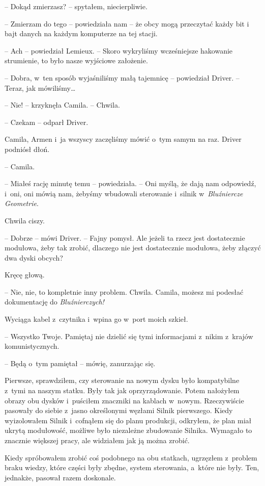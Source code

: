 \documentclass[oneside,polish,12pt,sfheadings]{mwbk}
\begin{document}
-- Dokąd zmierzasz? -- spytałem, niecierpliwie.

-- Zmierzam do tego -- powiedziała nam -- że obcy mogą przeczytać każdy bit
i bajt danych na każdym komputerze na tej stacji.

-- Ach -- powiedział Lemieux. -- Skoro wykryliśmy wcześniejsze hakowanie
strumienie, to było nasze wyjściowe założenie.

-- Dobra, w~ten sposób wyjaśniliśmy małą tajemnicę -- powiedział Driver.
-- Teraz, jak mówiliśmy\ldots

-- Nie! -- krzyknęła Camila. -- Chwila.

-- Czekam -- odparł Driver.

Camila, Armen i~ja wszyscy zaczęliśmy mówić o~tym samym na raz. Driver
podniósł dłoń.

-- Camila.

-- Miałeś rację minutę temu -- powiedziała. -- Oni myślą, że dają nam
odpowiedź, i~oni, oni mówią nam, żebyśmy wbudowali sterowanie i~silnik w~\emph{Bluźniercze Geometrie}.

Chwila ciszy.

-- Dobrze -- mówi Driver. -- Fajny pomysł. Ale jeżeli ta rzecz jest
dostatecznie modułowa, żeby tak zrobić, dlaczego nie jest dostatecznie
modułowa, żeby złączyć dwa dyski obcych?

Kręcę głową. 

-- Nie, nie, to kompletnie inny problem. Chwila. Camila,
możesz mi podesłać dokumentację do \emph{Bluźnierczych!}

Wyciąga kabel z~czytnika i~wpina go w~port moich szkieł.

-- Wszystko Twoje. Pamiętaj nie dzielić się tymi informacjami z~nikim z~krajów komunistycznych.

-- Będą o~tym pamiętał -- mówię, zanurzając się.

Pierwsze, sprawdziłem, czy sterowanie na nowym dysku było kompatybilne z~tymi na naszym statku. Były tak jak oprzyrządowanie. Potem nałożyłem
obrazy obu dysków i~puściłem znaczniki na kablach w~nowym. Rzeczywiście
pasowały do siebie z~jasno określonymi węzłami Silnik pierwszego. Kiedy
wyizolowałem Silnik i~cofnąłem się do planu produkcji, odkryłem, że plan
miał ukrytą modułowość,  możliwe było niezależne zbudowanie Silnika.
Wymagało to znacznie większej pracy, ale widziałem jak ją można zrobić.

Kiedy spróbowałem zrobić coś podobnego na obu statkach, ugrzęzłem z~problem braku wiedzy, które części były zbędne, system sterowania, a~które nie były. Ten, jednakże, pasował razem doskonale.
\end{document}
